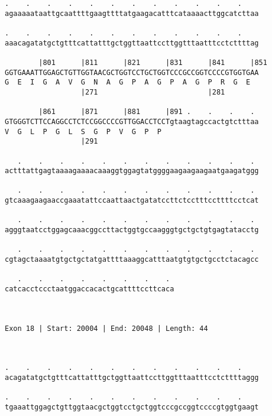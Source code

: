 \documentclass{article}
\begin{document}
\begin{Verbatim}
.    .    .    .    .    .    .    .    .    .    .    .    
agaaaaataattgcaattttgaagttttatgaagacatttcataaaacttggcatcttaa
                                                            
.    .    .    .    .    .    .    .    .    .    .    .    
aaacagatatgctgtttcattatttgctggttaattccttggtttaatttcctcttttag
                                                            
        |801      |811      |821      |831      |841      |851
GGTGAAATTGGAGCTGTTGGTAACGCTGGTCCTGCTGGTCCCGCCGGTCCCCGTGGTGAA
G  E  I  G  A  V  G  N  A  G  P  A  G  P  A  G  P  R  G  E  
                  |271                          |281        
  
        |861      |871      |881      |891 .    .    .    . 
GTGGGTCTTCCAGGCCTCTCCGGCCCCGTTGGACCTCCTgtaagtagccactgtctttaa
V  G  L  P  G  L  S  G  P  V  G  P  P                       
                  |291                                      
  
   .    .    .    .    .    .    .    .    .    .    .    . 
actttattgagtaaaagaaaacaaaggtggagtatggggaagaagaagaatgaagatggg
                                                            
   .    .    .    .    .    .    .    .    .    .    .    . 
gtcaaagaagaaccgaaatattccaattaactgatatccttctcctttccttttcctcat
                                                            
   .    .    .    .    .    .    .    .    .    .    .    . 
agggtaatcctggagcaaacggccttactggtgccaagggtgctgctgtgagtatacctg
                                                            
   .    .    .    .    .    .    .    .    .    .    .    . 
cgtagctaaaatgtgctgctatgattttaaaggcatttaatgtgtgctgcctctacagcc
                                                            
   .    .    .    .    .    .    .    . 
catcacctccctaatggaccacactgcattttccttcaca
                                        
                                        
 
Exon 18 | Start: 20004 | End: 20048 | Length: 44



.    .    .    .    .    .    .    .    .    .    .    .    
acagatatgctgtttcattatttgctggttaattccttggtttaatttcctcttttaggg
                                                            
.    .    .    .    .    .    .    .    .    .    .    .    
tgaaattggagctgttggtaacgctggtcctgctggtcccgccggtccccgtggtgaagt
                                                            

\end{Verbatim}
\end{document}
